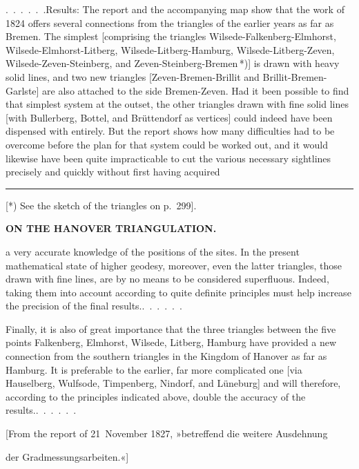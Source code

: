 \par\noindent\hspace*{\parindent}\mbox{.\ .\ .\ .\ .\ .}\quad Results: The report and the accompanying map show that the work
of 1824 offers several connections from the triangles of the earlier years as
far as Bremen. The simplest [comprising the triangles Wilsede-Falkenberg-Elmhorst,
Wilsede-Elmhorst-Litberg, Wilsede-Litberg-Hamburg, Wilsede-Litberg-Zeven,
Wilsede-Zeven-Steinberg, and Zeven-Steinberg-Bremen\,*)] is drawn with heavy
solid lines, and two new triangles [Zeven-Bremen-Brillit and Brillit-Bremen-Garlste]
are also attached to the side Bremen-Zeven. Had it been possible to find that
simplest system at the outset, the other triangles drawn with fine solid lines
[with Bullerberg, Bottel, and Brüttendorf as vertices] could indeed have been
dispensed with entirely. But the report shows how many difficulties had to be
overcome before the plan for that system could be worked out, and it would
likewise have been quite impracticable to cut the various necessary sightlines
precisely and quickly without first having acquired
\par\vfill\noindent\rule{0.25\linewidth}{0.4pt}\par\smallskip
{\footnotesize\noindent\hspace*{\parindent}[*) See the sketch of the triangles on p.~299].\par}
\clearpage
\noindent\null\hfill{\small\textbf{ON THE HANOVER TRIANGULATION.}}\hfill{}\par\medskip
\noindent a very accurate knowledge of the positions of the sites.
In the present mathematical state of higher geodesy, moreover, even the latter
triangles, those drawn with fine lines, are by no means to be considered
superfluous. Indeed, taking them into account according to quite definite
principles must help increase the precision of the final results.\quad\mbox{.\ .\ .\ .\ .\ .}

Finally, it is also of great importance that the three triangles between the
five points Falkenberg, Elmhorst, Wilsede, Litberg, Hamburg have provided a new
connection from the southern triangles in the Kingdom of Hanover as far as
Hamburg. It is preferable to the earlier, far more complicated one [via
Hauselberg, Wulfsode, Timpenberg, Nindorf, and Lüneburg] and will therefore,
according to the principles indicated above, double the accuracy of the
results.\quad\mbox{.\ .\ .\ .\ .\ .}

\bigskip
\begin{center}
[From the report of 21~November 1827, »betreffend die weitere Ausdehnung\par
der Gradmessungsarbeiten.«]
\end{center}

